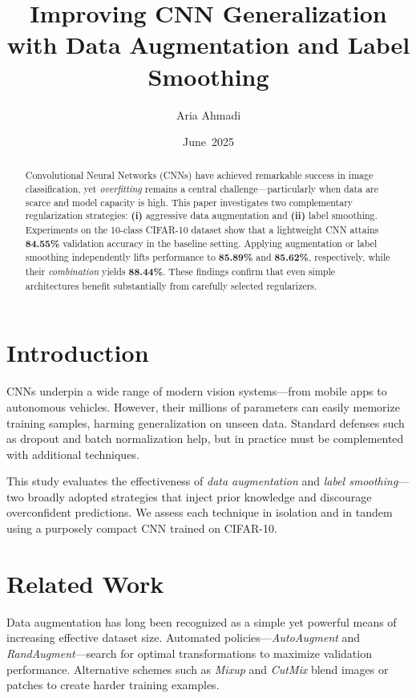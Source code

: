 \documentclass[11pt]{article}
\title{Improving CNN Generalization with Data Augmentation and Label Smoothing}
\author{Aria Ahmadi}
\date{June~2025}
\begin{document}
\maketitle

\begin{abstract}
Convolutional Neural Networks (CNNs) have achieved remarkable success in image classification, yet \emph{overfitting} remains a central challenge---particularly when data are scarce and model capacity is high. This paper investigates two complementary regularization strategies: \textbf{(i)} aggressive data augmentation and \textbf{(ii)} label smoothing. Experiments on the 10-class CIFAR-10 dataset show that a lightweight CNN attains \textbf{84.55\%} validation accuracy in the baseline setting. Applying augmentation or label smoothing independently lifts performance to \textbf{85.89\%} and \textbf{85.62\%}, respectively, while their \emph{combination} yields \textbf{88.44\%}. These findings confirm that even simple architectures benefit substantially from carefully selected regularizers.
\end{abstract}

\section{Introduction}
CNNs underpin a wide range of modern vision systems---from mobile apps to autonomous vehicles. However, their millions of parameters can easily memorize training samples, harming generalization on unseen data. Standard defenses such as dropout and batch normalization help, but in practice must be complemented with additional techniques.

This study evaluates the effectiveness of \emph{data augmentation} and \emph{label smoothing}---two broadly adopted strategies that inject prior knowledge and discourage overconfident predictions. We assess each technique in isolation and in tandem using a purposely compact CNN trained on CIFAR-10.

\section{Related Work}
Data augmentation has long been recognized as a simple yet powerful means of increasing effective dataset size. Automated policies---\textit{AutoAugment} and \textit{RandAugment}---search for optimal transformations to maximize validation performance. Alternative schemes such as \textit{Mixup}\cite{mixup2018} and \textit{CutMix}\cite{yun2019cutmix} blend images or patches to create harder training examples.
\end{document}
